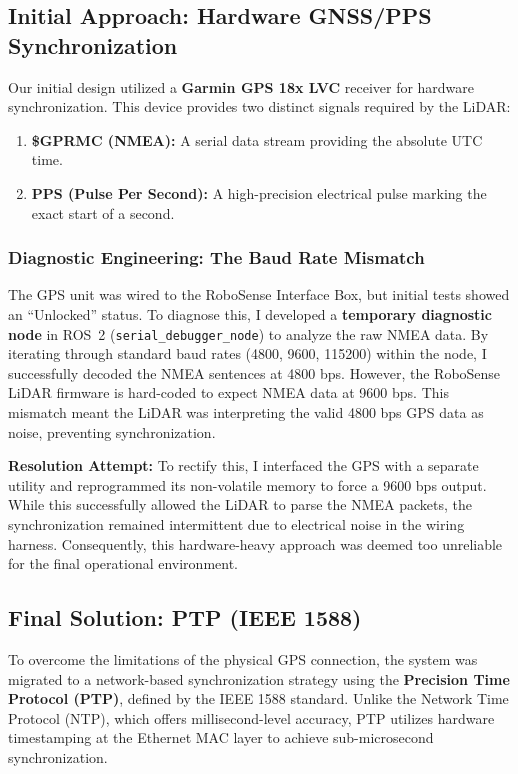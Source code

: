 \documentclass[12pt,a4paper]{report}
\begin{document}
\subsection{Initial Approach: Hardware GNSS/PPS Synchronization}
Our initial design utilized a \textbf{Garmin GPS 18x LVC} receiver for hardware synchronization. This device provides two distinct signals required by the LiDAR:
\begin{enumerate}
    \item \textbf{\$GPRMC (NMEA):} A serial data stream providing the absolute UTC time.
    \item \textbf{PPS (Pulse Per Second):} A high-precision electrical pulse marking the exact start of a second.
\end{enumerate}

\subsubsection{Diagnostic Engineering: The Baud Rate Mismatch}
The GPS unit was wired to the RoboSense Interface Box, but initial tests showed an ``Unlocked'' status. To diagnose this, I developed a \textbf{temporary diagnostic node} in ROS~2 (\texttt{serial\_debugger\_node}) to analyze the raw NMEA data.
By iterating through standard baud rates (4800, 9600, 115200) within the node, I successfully decoded the NMEA sentences at 4800 bps. However, the RoboSense LiDAR firmware is hard-coded to expect NMEA data at 9600 bps. This mismatch meant the LiDAR was interpreting the valid 4800 bps GPS data as noise, preventing synchronization.

\textbf{Resolution Attempt:}
To rectify this, I interfaced the GPS with a separate utility and reprogrammed its non-volatile memory to force a 9600 bps output. While this successfully allowed the LiDAR to parse the NMEA packets, the synchronization remained intermittent due to electrical noise in the wiring harness. Consequently, this hardware-heavy approach was deemed too unreliable for the final operational environment.

\subsection[Final Solution: PTP]{Final Solution: PTP (IEEE 1588)}
To overcome the limitations of the physical GPS connection, the system was migrated to a network-based synchronization strategy using the \textbf{Precision Time Protocol (PTP)}, defined by the IEEE 1588 standard. Unlike the Network Time Protocol (NTP), which offers millisecond-level accuracy, PTP utilizes hardware timestamping at the Ethernet MAC layer to achieve sub-microsecond synchronization.
\end{document}
